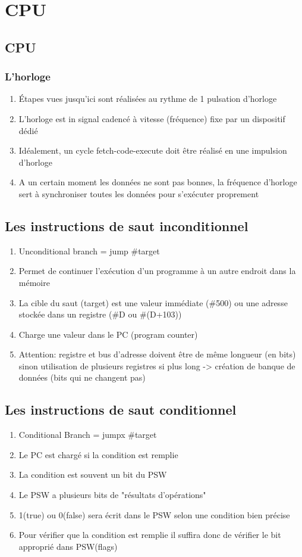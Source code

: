 \chapter{CPU}
\section{CPU}
\subsection{L'horloge}
\begin{enumerate}
  \item Étapes vues jusqu'ici sont réalisées au rythme de 1 pulsation d'horloge
  \item L'horloge est in signal cadencé à vitesse (fréquence) fixe par un dispositif dédié
  \item Idéalement, un cycle fetch-code-execute doit être réalisé en une impulsion d'horloge
  \item A un certain moment les données ne sont pas bonnes, la fréquence d'horloge sert à synchroniser toutes les données pour s'exécuter proprement
\end{enumerate}

\section{Les instructions de saut inconditionnel}
\begin{enumerate}
\item Unconditional branch = jump \#target
\item Permet de continuer l'exécution d'un programme à un autre endroit dans la mémoire
\item La cible du saut (target) est une valeur immédiate (\#500) ou une adresse stockée dans un registre (\#D ou \#(D+103))
\item Charge une valeur dans le PC (program counter)
\item Attention: registre et bus d'adresse doivent être de même longueur (en bits) sinon utilisation de plusieurs registres si plus long -> création de banque de données (bits qui ne changent pas)
\end{enumerate}

\section{Les instructions de saut conditionnel} 
\begin{enumerate}
\item Conditional Branch = jumpx \#target
\item Le PC est chargé si la condition est remplie
\item La condition est souvent un bit du PSW
\item Le PSW a plusieurs bits de "résultats d'opérations"
\item 1(true) ou 0(false) sera écrit dans le PSW selon une condition bien précise 
\item Pour vérifier que la condition est remplie il suffira donc de vérifier le bit approprié dans PSW(flags)
\end{enumerate}
